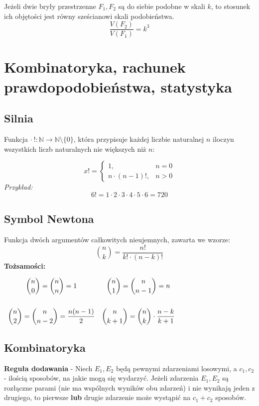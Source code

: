 \documentclass[14pt,a4paper]{extarticle}
\begin{document}
\noindent Jeżeli dwie bryły przestrzenne $F_{1}, F_{2}$ są do siebie podobne w skali $k$, to stosunek
ich objętości jest równy sześcianowi skali podobieństwa.
$$\dfrac{V(F_{2})}{V(F_{1})}=k^{3}$$

\newpage
\section{Kombinatoryka, rachunek prawdopodobieństwa, statystyka}
\subsection{Silnia} Funkcja $\cdot\: !: \mathbb{N} \rightarrow \mathbb{N}\setminus\{0\}$, która przypisuje każdej
liczbie naturalnej $n$ iloczyn wszystkich liczb naturalnych nie większych niż $n$:

\begin{equation*}
   x! = \left\{
      \begin{array}{ll}
         1, & n = 0 \\
         n\cdot (n-1)!, & n > 0
      \end{array}
   \right.
\end{equation*}
\noindent \textit{Przykład:}
$$6! = 1\cdot 2\cdot 3\cdot 4\cdot 5\cdot 6 = 720$$

\subsection{Symbol Newtona}
Funkcja dwóch argumentów całkowitych nieujemnych, zawarta we wzorze:
$$\binom{n}{k} = \dfrac{n!}{k!\cdot (n-k)!}$$
\noindent\textbf{Tożsamości:}
\begin{center}
   \(
   \begin{array}{cc}
      \dbinom{n}{0} = \dbinom{n}{n} = 1 & \dbinom{n}{1} = \dbinom{n}{n-1} = n\\[0.9cm]
      \dbinom{n}{2} = \dbinom{n}{n-2} = \dfrac{n(n-1)}{2} & \dbinom{n}{k+1} = \dbinom{n}{k}\cdot \dfrac{n-k}{k+1}\\
   \end{array}
   \)

\end{center}

\subsection{Kombinatoryka}
\noindent\textbf{Reguła dodawania} - Niech $E_{1}, E_{2}$ będą pewnymi zdarzeniami losowymi, a
$c_{1}, c_{2}$ - ilością sposobów, na jakie mogą się wydarzyć. Jeżeli zdarzenia $E_{1}, E_{2}$
są rozłączne parami (nie ma wspólnych wyników obu zdarzeń) i nie wynikają jeden z drugiego,
to pierwsze \textbf{lub} drugie zdarzenie może wystąpić na $c_{1} + c_{2}$ sposobów.\\
\end{document}
